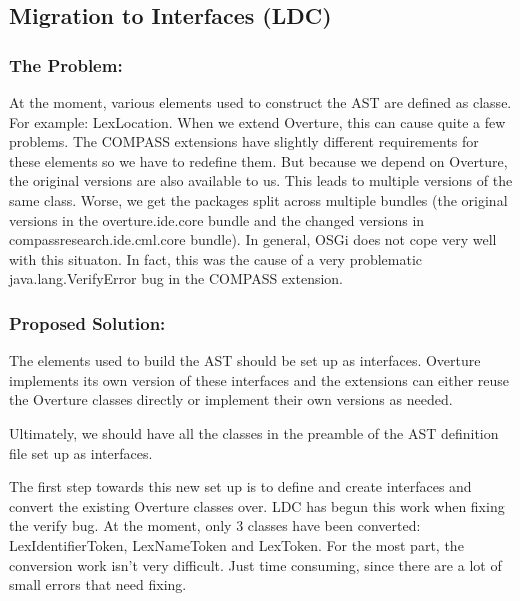 \documentclass[11pt]{report}
\begin{document}
\subsection*{Migration to Interfaces (LDC)}
    \label{ssec:interfacemig}

    \subsubsection{The Problem:}

    At the moment, various elements used to construct the AST are defined as
    classe. For example: \textsf{LexLocation}. When we extend Overture, this can cause
    quite a few problems. The COMPASS extensions have slightly different
    requirements for these elements so we have to redefine them. But because we
    depend on Overture, the original versions are also available to us. This
    leads to multiple versions of the same class. Worse, we get the packages
    split across multiple bundles (the original versions in the
    overture.ide.core bundle and the changed versions in
    compassresearch.ide.cml.core bundle). In general, OSGi does not cope very
    well with this situaton. In fact, this was the cause of a very problematic
    \textsf{java.lang.VerifyError} bug in the COMPASS extension.




    \subsubsection{Proposed Solution:}
    
    The elements used to build the AST should be set up as interfaces. Overture
    implements its own version of these interfaces and the extensions can either 
    reuse the Overture classes directly or implement their own versions as needed.

    Ultimately, we should have all the classes in the preamble of the AST definition
    file set up as interfaces.

    The first step towards this new set up is to define and create interfaces and
    convert the existing Overture classes over. LDC has begun this work when fixing
    the verify bug. At the moment, only 3 classes have been converted:
    \textsf{LexIdentifierToken}, \textsf{LexNameToken} and \textsf{LexToken}. For 
    the most part, the conversion work isn't very difficult. Just time consuming, 
    since there are a lot of small errors that need fixing.
    
\end{document}

